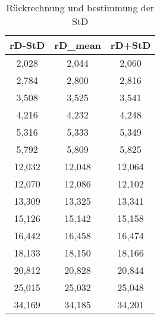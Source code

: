 \begin{table}[H]
  \centering
  \caption{Rückrechnung und bestimmung der StD}
    \begin{tabular}{ccc}
    \toprule
    \multicolumn{1}{l}{\textbf{rD-StD}} & \multicolumn{1}{l}{\textbf{rD_mean}} & \multicolumn{1}{l}{\textbf{rD+StD}} \\
    \midrule
    2,028 & 2,044 & 2,060 \\
    2,784 & 2,800 & 2,816 \\
    3,508 & 3,525 & 3,541 \\
    4,216 & 4,232 & 4,248 \\
    5,316 & 5,333 & 5,349 \\
    5,792 & 5,809 & 5,825 \\
    12,032 & 12,048 & 12,064 \\
    12,070 & 12,086 & 12,102 \\
    13,309 & 13,325 & 13,341 \\
    15,126 & 15,142 & 15,158 \\
    16,442 & 16,458 & 16,474 \\
    18,133 & 18,150 & 18,166 \\
    20,812 & 20,828 & 20,844 \\
    25,015 & 25,032 & 25,048 \\
    34,169 & 34,185 & 34,201 \\
    \bottomrule
    \end{tabular}%
  \label{tab:addlabel}%
\end{table}%
